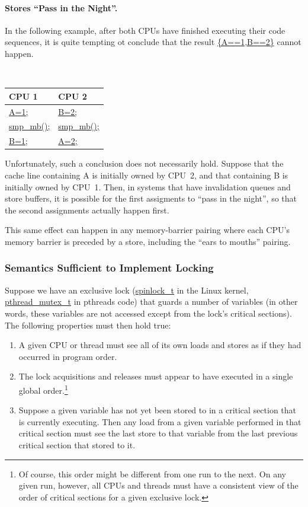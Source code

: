 \paragraph{Stores ``Pass in the Night''.}
	In the following example, after both CPUs have finished
	executing their code sequences, it is quite tempting ot
	conclude that the result \url{{A==1,B==2}} cannot happen.
	\vspace{5pt}
	\begin{minipage}[t]{\columnwidth}
	\tt
	\begin{tabular}{l|l}
		CPU 1 &			CPU 2 \\
		\hline
		\url{A=1;} &		\url{B=2;} \\
		\url{smp_mb();} &	\url{smp_mb();} \\
		\url{B=1;} &		\url{A=2;} \\
	\end{tabular}
	\end{minipage}
	\vspace{5pt}
	Unfortunately, such a conclusion does not necessarily hold.
	Suppose that the cache line containing A is initially owned
	by CPU~2, and that containing B is initially owned by CPU~1.
	Then, in systems that have invalidation queues and store
	buffers, it is possible for the first assigments to ``pass
	in the night'', so that the second assignments actually
	happen first.
		 {}

	This same effect can happen in any memory-barrier pairing
	where each CPU's memory barrier is preceded by a store,
	including the ``ears to mouths'' pairing.

\subsubsection{Semantics Sufficient to Implement Locking}

Suppose we have an exclusive lock (\url{spinlock_t} in the Linux
kernel, \url{pthread_mutex_t} in pthreads code) that guards a number
of variables (in other words, these variables are not accessed except
from the lock's critical sections).
The following properties must then hold true:
\begin{enumerate}
\item	A given CPU or thread must see all of its own loads and stores
	as if they had occurred in program order.
\item	The lock acquisitions and releases must appear to have executed
	in a single global order.\footnote{
		Of course, this order might be different from one run
		to the next.
		On any given run, however, all CPUs and threads must
		have a consistent view of the order of critical sections
		for a given exclusive lock.}
\item	Suppose a given variable has not yet been stored to in a
	critical section that is currently executing.
	Then any load from a given variable performed in that critical section
	must see the last store to that variable from the last previous
	critical section that stored to it.
\end{enumerate}

